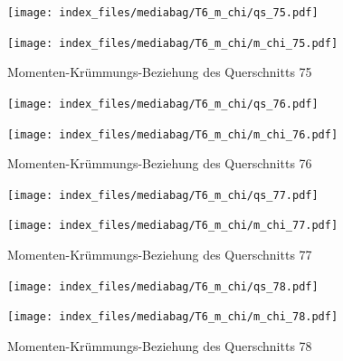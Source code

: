 \documentclass[
  11pt,
  letterpaper,
]{scrreprt}
\begin{document}
\begin{figure}[H]

\begin{minipage}{0.50\linewidth}
\texttt{[image: index\_files/mediabag/T6\_m\_chi/qs\_75.pdf]}\end{minipage}%
%
\begin{minipage}{0.50\linewidth}
\texttt{[image: index\_files/mediabag/T6\_m\_chi/m\_chi\_75.pdf]}\end{minipage}%

\caption{\label{fig-mchi_anhang}Momenten-Krümmungs-Beziehung des
Querschnitts 75}

\end{figure}%

\begin{figure}[H]

\begin{minipage}{0.50\linewidth}
\texttt{[image: index\_files/mediabag/T6\_m\_chi/qs\_76.pdf]}\end{minipage}%
%
\begin{minipage}{0.50\linewidth}
\texttt{[image: index\_files/mediabag/T6\_m\_chi/m\_chi\_76.pdf]}\end{minipage}%

\caption{\label{fig-mchi_anhang}Momenten-Krümmungs-Beziehung des
Querschnitts 76}

\end{figure}%

\begin{figure}[H]

\begin{minipage}{0.50\linewidth}
\texttt{[image: index\_files/mediabag/T6\_m\_chi/qs\_77.pdf]}\end{minipage}%
%
\begin{minipage}{0.50\linewidth}
\texttt{[image: index\_files/mediabag/T6\_m\_chi/m\_chi\_77.pdf]}\end{minipage}%

\caption{\label{fig-mchi_anhang}Momenten-Krümmungs-Beziehung des
Querschnitts 77}

\end{figure}%

\begin{figure}[H]

\begin{minipage}{0.50\linewidth}
\texttt{[image: index\_files/mediabag/T6\_m\_chi/qs\_78.pdf]}\end{minipage}%
%
\begin{minipage}{0.50\linewidth}
\texttt{[image: index\_files/mediabag/T6\_m\_chi/m\_chi\_78.pdf]}\end{minipage}%

\caption{\label{fig-mchi_anhang}Momenten-Krümmungs-Beziehung des
Querschnitts 78}

\end{figure}%
\end{document}

